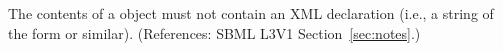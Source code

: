 The contents of a \Notes object must not contain an XML
declaration (i.e., a string of the form  or similar).  (References: 
SBML L3V1 Section~\ref{sec:notes}.)

